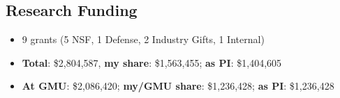 \documentclass[11pt]{article}
\begin{document}
\subsection{Research Funding}
\begin{itemize}[label={},before=\small]
    \item 9 grants (5 NSF, 1 Defense, 2 Industry Gifts, 1 Internal)
    
    \item \textbf{Total}: \$2,804,587, \textbf{my share}: \$1,563,455;  \textbf{as PI}: \$1,404,605
    \item \textbf{At GMU}: \$2,086,420; \textbf{my/GMU share}: \$1,236,428; \textbf{as PI}: \$1,236,428
\end{itemize}


\end{document}
